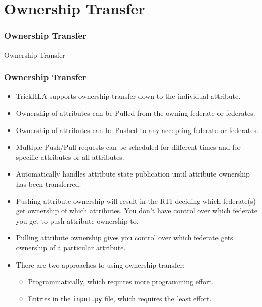 
   \section{Ownership Transfer}

   \begin{frame}
      \frametitle{Ownership Transfer}
      \begin{center}
      \Huge{Ownership Transfer}
      \end{center}
   \end{frame}
   
   \begin{frame}
      \frametitle{Ownership Transfer}
      \begin{small}
      \begin{itemize}
         \item TrickHLA supports ownership transfer down to the individual attribute.
         \item Ownership of attributes can be Pulled from the owning federate or federates.
         \item Ownership of attributes can be Pushed to any accepting federate or federates.
         \item Multiple Push/Pull requests can be scheduled for different times
         and for specific attributes or all attributes.
         \item Automatically handles attribute state publication until attribute
         ownership has been transferred.
         \item Pushing attribute ownership will result in the RTI deciding which
         federate(s) get ownership of which attributes. You don’t have control
         over which federate you get to push attribute ownership to.
         \item Pulling attribute ownership gives you control over which federate
         gets ownership of a particular attribute.
         \item There are two approaches to using ownership transfer:
         \begin{itemize}
            \item Programmatically, which requires more programming effort.
            \item Entries in the \texttt{input.py} file, which requires the least effort.
         \end{itemize}
      \end{itemize}
      \end{small}
   \end{frame}

